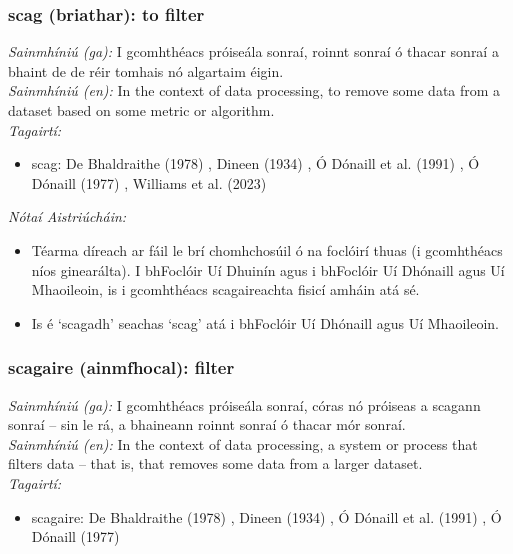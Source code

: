 \documentclass{article}
\begin{document}
\subsubsection*{scag (briathar): to filter}
 \noindent \textit{Sainmhíniú (ga):} I gcomhthéacs próiseála sonraí, roinnt sonraí ó thacar sonraí a bhaint de de réir tomhais nó algartaim éigin.
\\
 \noindent \textit{Sainmhíniú (en):} In the context of data processing, to remove some data from a dataset based on some metric or algorithm.
\\
 \noindent \textit{Tagairtí:}
\begin{itemize}
	\item scag: De Bhaldraithe (1978) \cite{de-bhaldraithe}, Dineen (1934) \cite{dineen}, Ó Dónaill et al. (1991) \cite{focloir-beag}, Ó Dónaill (1977) \cite{odonaill}, Williams et al. (2023) \cite{storchiste}
\end{itemize}

 \noindent \textit{Nótaí Aistriúcháin:}
\begin{itemize}
	\item Téarma díreach ar fáil le brí chomhchosúil ó na foclóirí thuas (i gcomhthéacs níos ginearálta). I bhFoclóir Uí Dhuinín agus i bhFoclóir Uí Dhónaill agus Uí Mhaoileoin, is i gcomhthéacs scagaireachta fisicí amháin atá sé.
	\item Is é `scagadh' seachas `scag' atá i bhFoclóir Uí Dhónaill agus Uí Mhaoileoin.
\end{itemize}


\subsubsection*{scagaire (ainmfhocal): filter}
 \noindent \textit{Sainmhíniú (ga):} I gcomhthéacs próiseála sonraí, córas nó próiseas a scagann sonraí -- sin le rá, a bhaineann roinnt sonraí ó thacar mór sonraí.
\\
 \noindent \textit{Sainmhíniú (en):} In the context of data processing, a system or process that filters data -- that is, that removes some data from a larger dataset.
\\
 \noindent \textit{Tagairtí:}
\begin{itemize}
	\item scagaire: De Bhaldraithe (1978) \cite{de-bhaldraithe}, Dineen (1934) \cite{dineen}, Ó Dónaill et al. (1991) \cite{focloir-beag}, Ó Dónaill (1977) \cite{odonaill}
\end{itemize}
\end{document}
